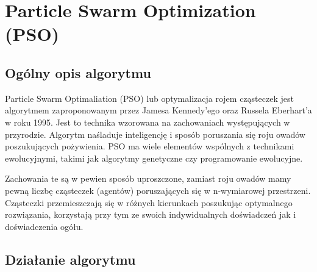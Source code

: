 
\section{Particle Swarm Optimization (PSO)}
\author{Paweł Jastrzębski}
\subsection{Ogólny opis algorytmu}
\par Particle Swarm Optimaliation (PSO) lub optymalizacja rojem cząsteczek jest algorytmem zaproponowanym przez Jamesa Kennedy'ego oraz Russela Eberhart'a w roku 1995. Jest to technika wzorowana na zachowaniach występujących w przyrodzie. Algorytm naśladuje inteligencję i sposób poruszania się roju owadów poszukujących pożywienia. PSO ma wiele elementów wspólnych z technikami ewolucyjnymi, takimi jak algorytmy genetyczne czy programowanie ewolucyjne.
\par Zachowania te są w pewien sposób uproszczone, zamiast roju owadów mamy pewną liczbę cząsteczek (agentów) poruszających się w n-wymiarowej przestrzeni. Cząsteczki przemieszczają się w różnych kierunkach poszukując optymalnego rozwiązania, korzystają przy tym ze swoich indywidualnych doświadczeń jak i doświadczenia ogółu.
\subsection{Działanie algorytmu}
